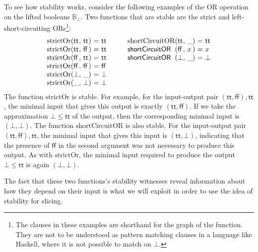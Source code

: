 \begin{example}
  To see how stability works, consider the following examples of the
  OR operation on the lifted booleans $\mathbb{B}_\bot$. Two functions
  that are stable are the strict and left-short-circuiting
  ORs\footnote{The clauses in these examples are shorthand for the
    graph of the function. They are not to be understood as pattern
    matching clauses in a language like Haskell, where it is not
    possible to match on $\bot$.}:
  \begin{displaymath}
    \begin{array}[t]{l@{(}l@{,~}l@{)~}c@{~}l}
      \mathrm{strictOr}&\mathsf{tt}&\mathsf{tt}&=&\mathsf{tt} \\
      \mathrm{strictOr}&\mathsf{tt}&\mathsf{ff}&=&\mathsf{tt} \\
      \mathrm{strictOr}&\mathsf{ff}&\mathsf{tt}&=&\mathsf{tt} \\
      \mathrm{strictOr}&\mathsf{ff}&\mathsf{ff}&=&\mathsf{ff} \\
      \mathrm{strictOr}&\bot&\_&=&\bot \\
      \mathrm{strictOr}&\_&\bot&=&\bot \\
    \end{array}
    \qquad
    \begin{array}[t]{l@{(}l@{,~}l@{)~}c@{~}l}
      \mathrm{shortCircuitOR}&\mathsf{tt}&\_&=&\mathsf{tt} \\
      \mathsf{shortCircuitOR}&\mathsf{ff}&x&=&x \\
      \mathsf{shortCircuitOR}&\bot&\_& =& \bot
    \end{array}
  \end{displaymath}
  The function $\mathrm{strictOr}$ is stable. For example, for the
  input-output pair $(\mathsf{tt},\mathsf{ff}), \mathsf{tt}$, the
  minimal input that gives this output is exactly
  $(\mathsf{tt}, \mathsf{ff})$. If we take the approximation
  $\bot \leq \mathsf{tt}$ of the output, then the corresponding
  minimal input is $(\bot, \bot)$. The function
  $\mathrm{shortCircuitOR}$ is also stable. For the input-output pair
  $(\mathsf{tt},\mathsf{ff}),\mathsf{tt}$, the minimal input that
  gives this input is $(\mathsf{tt},\bot)$, indicating that the
  presence of $\mathsf{ff}$ in the second argument was not necessary
  to produce this output. As with $\mathrm{strictOr}$, the minimal
  input required to produce the output $\bot \leq \mathsf{tt}$ is
  again $(\bot,\bot)$.

  The fact that these two functions's stability witnesses reveal
  information about how they depend on their input is what we will
  exploit in order to use the idea of stability for slicing.
\end{example}

